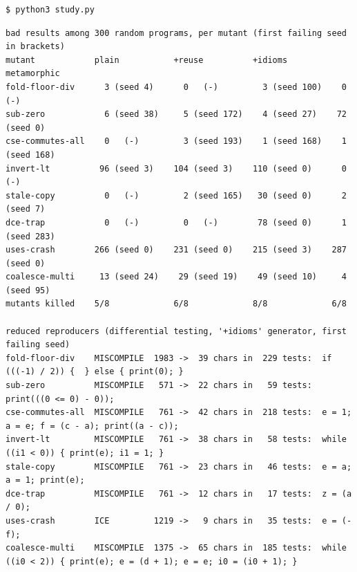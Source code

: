 \documentclass[10pt,a4paper,openany,oneside]{report}
\begin{document}
\begin{lstlisting}[style=shcmd,basicstyle=\ttfamily\scriptsize]
$ python3 study.py
\end{lstlisting}
\begin{lstlisting}[style=out,basicstyle=\ttfamily\scriptsize]
bad results among 300 random programs, per mutant (first failing seed in brackets)
mutant            plain           +reuse          +idioms         metamorphic    
fold-floor-div      3 (seed 4)      0   (-)         3 (seed 100)    0   (-)      
sub-zero            6 (seed 38)     5 (seed 172)    4 (seed 27)    72 (seed 0)   
cse-commutes-all    0   (-)         3 (seed 193)    1 (seed 168)    1 (seed 168) 
invert-lt          96 (seed 3)    104 (seed 3)    110 (seed 0)      0   (-)      
stale-copy          0   (-)         2 (seed 165)   30 (seed 0)      2 (seed 7)   
dce-trap            0   (-)         0   (-)        78 (seed 0)      1 (seed 283) 
uses-crash        266 (seed 0)    231 (seed 0)    215 (seed 3)    287 (seed 0)   
coalesce-multi     13 (seed 24)    29 (seed 19)    49 (seed 10)     4 (seed 95)  
mutants killed    5/8             6/8             8/8             6/8            

reduced reproducers (differential testing, '+idioms' generator, first failing seed)
fold-floor-div    MISCOMPILE  1983 ->  39 chars in  229 tests:  if (((-1) / 2)) {  } else { print(0); }
sub-zero          MISCOMPILE   571 ->  22 chars in   59 tests:  print(((0 <= 0) - 0));
cse-commutes-all  MISCOMPILE   761 ->  42 chars in  218 tests:  e = 1; a = e; f = (c - a); print((a - c));
invert-lt         MISCOMPILE   761 ->  38 chars in   58 tests:  while ((i1 < 0)) { print(e); i1 = 1; }
stale-copy        MISCOMPILE   761 ->  23 chars in   46 tests:  e = a; a = 1; print(e);
dce-trap          MISCOMPILE   761 ->  12 chars in   17 tests:  z = (a / 0);
uses-crash        ICE         1219 ->   9 chars in   35 tests:  e = (-f);
coalesce-multi    MISCOMPILE  1375 ->  65 chars in  185 tests:  while ((i0 < 2)) { print(e); e = (d + 1); e = e; i0 = (i0 + 1); }
\end{lstlisting}
\end{document}
